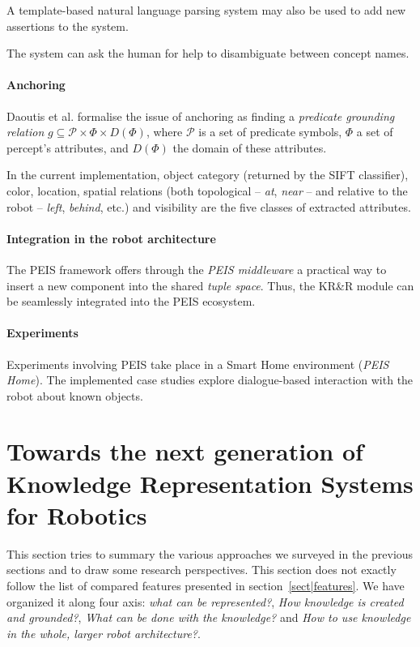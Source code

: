 \documentclass{IEEEtran}
\begin{document}
A template-based natural language parsing system may also be used to add new
assertions to the system.

The system can ask the human for help to disambiguate between concept names.

\paragraph{Anchoring} Daoutis et al. formalise the issue of anchoring as
finding a \emph{predicate grounding relation} $g \subseteq \mathcal{P} \times
\Phi \times D(\Phi)$, where $\mathcal{P}$ is a set of predicate symbols, $\Phi$
a set of percept's attributes, and $D(\Phi)$ the domain of these attributes.

In the current implementation, object category (returned by the SIFT
classifier), color, location, spatial relations (both topological -- \emph{at},
\emph{near} -- and relative to the robot -- \emph{left}, \emph{behind}, etc.)
and visibility are the five classes of extracted attributes.

\paragraph{Integration in the robot architecture}
\label{sect|peis-integration}

The PEIS framework offers through the \emph{PEIS middleware} a practical way to
insert a new component into the shared \emph{tuple space}.  Thus, the KR\&R
module can be seamlessly integrated into the PEIS ecosystem.

\paragraph{Experiments} Experiments involving PEIS take place in a Smart Home
environment (\emph{PEIS Home}). The implemented case studies explore
dialogue-based interaction with the robot about known objects.


\section{Towards the next generation of Knowledge Representation Systems for Robotics}
\label{sect|conclusion}

This section tries to summary the various approaches we surveyed in the
previous sections and to draw some research perspectives. This section does not
exactly follow the list of compared features presented in
section~\ref{sect|features}. We have organized it along four axis: \emph{what
can be represented?}, \emph{How knowledge is created and grounded?}, \emph{What
can be done with the knowledge?} and \emph{How to use knowledge in the whole,
larger robot architecture?}.
\end{document}
